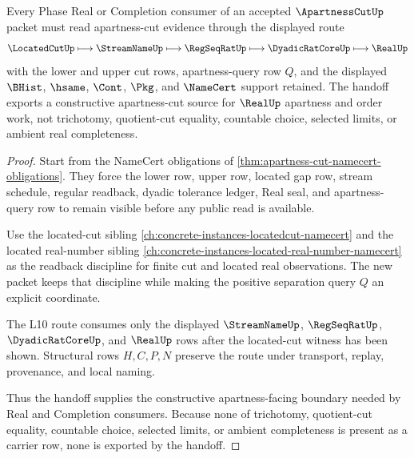 \begin{theorem}
\label{thm:apartness-cut-l10-handoff}
Every Phase Real or Completion consumer of an accepted $\ApartnessCutUp$ packet must read apartness-cut evidence through the displayed route
$$
\LocatedCutUp \longmapsto \StreamNameUp \longmapsto \RegSeqRatUp \longmapsto \DyadicRatCoreUp \longmapsto \RealUp
$$
with the lower and upper cut rows, apartness-query row $Q$, and the displayed $\BHist$, $\hsame$, $\Cont$, $\Pkg$, and $\NameCert$ support retained. The handoff exports a constructive apartness-cut source for $\RealUp$ apartness and order work, not trichotomy, quotient-cut equality, countable choice, selected limits, or ambient real completeness.
\end{theorem}
\begin{proof}
Start from the NameCert obligations of \autoref{thm:apartness-cut-namecert-obligations}. They force the lower row, upper row, located gap row, stream schedule, regular readback, dyadic tolerance ledger, Real seal, and apartness-query row to remain visible before any public read is available.

Use the located-cut sibling \autoref{ch:concrete-instances-locatedcut-namecert} and the located real-number sibling \autoref{ch:concrete-instances-located-real-number-namecert} as the readback discipline for finite cut and located real observations. The new packet keeps that discipline while making the positive separation query $Q$ an explicit coordinate.

The L10 route consumes only the displayed $\StreamNameUp$, $\RegSeqRatUp$, $\DyadicRatCoreUp$, and $\RealUp$ rows after the located-cut witness has been shown. Structural rows $H,C,P,N$ preserve the route under transport, replay, provenance, and local naming.

Thus the handoff supplies the constructive apartness-facing boundary needed by Real and Completion consumers. Because none of trichotomy, quotient-cut equality, countable choice, selected limits, or ambient completeness is present as a carrier row, none is exported by the handoff.
\end{proof}



